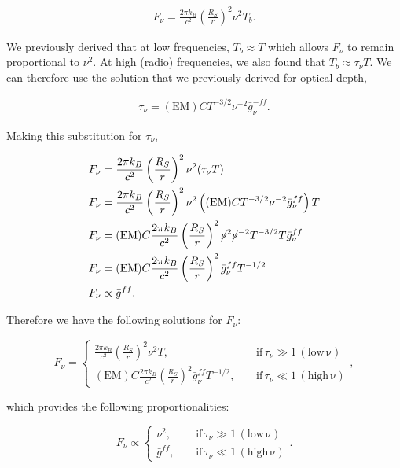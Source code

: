 \documentclass[12pt]{article}
\begin{document}
\begin{align*}
    \boxed{F_\nu = \frac{2\pi k_B}{c^2} \left(\frac{R_S}{r}\right)^2 \nu^2T_b}.
\end{align*}

We previously derived that at low frequencies, $T_b \approx T$ which allows $F_\nu$ to remain proportional to $\nu^2$. At high (radio) frequencies, we also found that $T_b \approx \tau_\nu T$. We can therefore use the solution that we previously derived for optical depth,

\begin{align*}
    \tau_\nu = (\mathrm{EM})CT^{-3/2}\nu^{-2}\bar{g}_\nu^{-ff}.
\end{align*}

{\noindent}Making this substitution for $\tau_\nu$,

\begin{equation*}
\begin{split}
    F_\nu &= \frac{2\pi k_B}{c^2} \left(\frac{R_S}{r}\right)^2 \nu^2(\tau_\nu T) \\
    F_\nu &= \frac{2\pi k_B}{c^2} \left(\frac{R_S}{r}\right)^2 \nu^2 \left((\mathrm{EM})CT^{-3/2}\nu^{-2}\bar{g}_\nu^{ff}\right) T \\
    F_\nu &= (\mathrm{EM})C \frac{2\pi k_B}{c^2} \left(\frac{R_S}{r}\right)^2 \cancel{\nu}^2\cancel{\nu}^{-2} T^{-3/2}T\bar{g}_\nu^{ff}\\
    F_\nu &= (\mathrm{EM})C \frac{2\pi k_B}{c^2} \left(\frac{R_S}{r}\right)^2 \bar{g}_\nu^{ff} T^{-1/2} \\
    F_\nu &\propto \bar{g}^{ff}.
\end{split}
\end{equation*}

Therefore we have the following solutions for $F_\nu$:

\begin{equation*}
\boxed{ 
F_\nu =
\left\{
\begin{aligned}
\frac{2\pi k_B}{c^2} \left(\frac{R_S}{r}\right)^2 \nu^2T,       ~~~~~& \mathrm{if}\,\tau_\nu \gg 1 \,\mathrm{(low\,\nu)} \\
(\mathrm{EM})C \frac{2\pi k_B}{c^2} \left(\frac{R_S}{r}\right)^2 \bar{g}_\nu^{ff} T^{-1/2},~~~~~& \mathrm{if}\,\tau_\nu \ll 1 \,\mathrm{(high\,\nu)}
\end{aligned}
\right.
},
\end{equation*}

{\noindent}which provides the following proportionalities:

\begin{equation*}
\boxed{ 
F_\nu \propto
\left\{
\begin{aligned}
\nu^2,       ~~~~~& \mathrm{if}\,\tau_\nu \gg 1 \,\mathrm{(low\,\nu)} \\
\bar{g}^{ff},~~~~~& \mathrm{if}\,\tau_\nu \ll 1 \,\mathrm{(high\,\nu)}
\end{aligned}
\right.
}.
\end{equation*}
\end{document}
